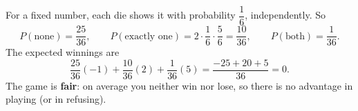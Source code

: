 For a fixed number, each die shows it with probability $\dfrac{1}{6}$, independently. So
\[
P(\text{none})=\dfrac{25}{36},\qquad P(\text{exactly one})=2\cdot\dfrac{1}{6}\cdot\dfrac{5}{6}=\dfrac{10}{36},\qquad P(\text{both})=\dfrac{1}{36}.
\]
The expected winnings are
\[
\dfrac{25}{36}(-1)+\dfrac{10}{36}(2)+\dfrac{1}{36}(5)=\dfrac{-25+20+5}{36}=\boxed{0}.
\]
The game is \textbf{fair}: on average you neither win nor lose, so there is no advantage in playing (or in refusing).
